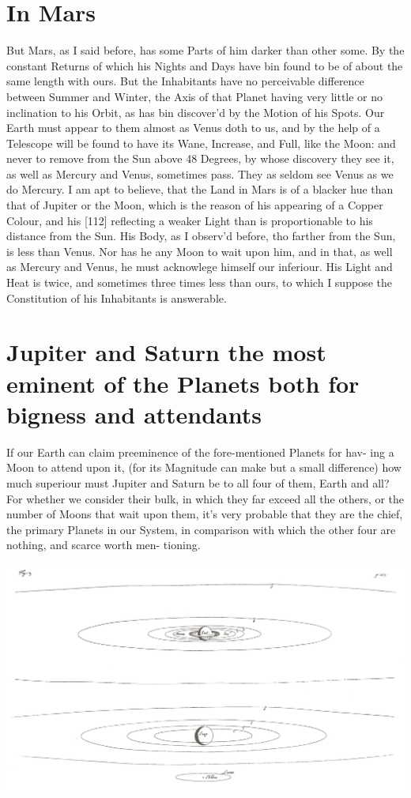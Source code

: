 \documentclass[letterpaper]{book}
\begin{document}
\section{In Mars}

But Mars, as I said before, has some Parts of him darker than other some.
By the constant Returns of which his Nights and Days have bin found to be of
about the same length with ours. But the Inhabitants have no perceivable
difference between Summer and Winter, the Axis of that Planet having very
little or no inclination to his Orbit, as has bin discover'd by the Motion
of his Spots. Our Earth must appear to them almost as Venus doth to us, and
by the help of a Telescope will be found to have its Wane, Increase, and
Full, like the Moon: and never to remove from the Sun above 48 Degrees, by
whose discovery they see it, as well as Mercury and Venus, sometimes pass.
They as seldom see Venus as we do Mercury. I am apt to believe, that the
Land in Mars is of a blacker hue than that of Jupiter or the Moon, which is
the reason of his appearing of a Copper Colour, and his [112] reflecting a
weaker Light than is proportionable to his distance from the Sun. His Body,
as I observ'd before, tho farther from the Sun, is less than Venus. Nor has
he any Moon to wait upon him, and in that, as well as Mercury and Venus, he
must acknowlege himself our inferiour. His Light and Heat is twice, and
sometimes three times less than ours, to which I suppose the Constitution of
his Inhabitants is answerable.



\section{Jupiter and Saturn the most eminent of the Planets both for bigness
and attendants}

If our Earth can claim preeminence of the fore-mentioned Planets for hav-
ing a Moon to attend upon it, (for its Magnitude can make but a small
difference) how much superiour must Jupiter and Saturn be to all four of
them, Earth and all? For whether we consider their bulk, in which they far
exceed all the others, or the number of Moons that wait upon them, it's very
probable that they are the chief, the primary Planets in our System, in
comparison with which the other four are nothing, and scarce worth men-
tioning. 

\begin{center}
	\includegraphics[width=.90\textwidth]{ct_3_en.jpg}
\end{center}
\end{document}
